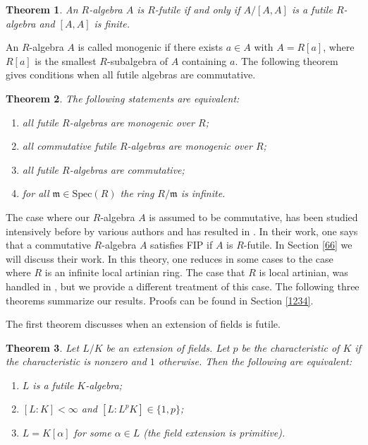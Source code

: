 \documentclass{amsart}
\theoremstyle{plain}
\newtheorem{theorem}{Theorem}[section]
\theoremstyle{definition}
\begin{document}
\begin{theorem} \label{130}
 An $R$-algebra $A$ is $R$-futile if and only if $A/[A,A]$ is a futile $R$-algebra and $[A,A]$ is finite.
\end{theorem}

An $R$-algebra $A$ is called monogenic if there exists $a
\in A$ with $A=R[a]$, where $R[a]$ is the smallest $R$-subalgebra of $A$ containing $a$.  The following theorem gives conditions when all futile
algebras are commutative. 

\begin{theorem} \label{24}
The following statements are equivalent:
\begin{enumerate}
\item all futile $R$-algebras are monogenic over $R$;
\item all commutative futile $R$-algebras are monogenic over $R$;
\item all futile $R$-algebras are commutative;
\item for all ${\mathfrak{m}} \in \mathrm{Spec}(R)$ the ring $R/{\mathfrak{m}}$ is infinite.
\end{enumerate}
\end{theorem}

The case where our $R$-algebra $A$ is assumed to be commutative, has been studied intensively before by various authors and has resulted in
\cite{DO5}. In their work, one says that a commutative $R$-algebra $A$ satisfies FIP if $A$ is $R$-futile. In Section \ref{66} we will discuss their
work. In this theory, one reduces in some cases to the case where $R$ is an infinite local
artinian ring. The case that $R$ is local artinian, was handled in \cite{DO5}, but we provide a different treatment of this case. The following three
theorems summarize our results. Proofs can be found in Section \ref{1234}. 

The first theorem discusses when an extension of fields is futile.

\begin{theorem} \label{401}
 Let $L/K$ be an extension of fields. Let $p$ be the characteristic of $K$ if the characteristic is nonzero and $1$ otherwise. Then the following are
equivalent:
\begin{enumerate}
 \item $L$ is a futile $K$-algebra;
 \item $[L:K] < \infty$ and $[L:L^p K] \in \{1,p\}$;
 \item $L=K[\alpha]$ for some $\alpha \in L$ (the field extension is primitive).
\end{enumerate}
\end{theorem}
\end{document}
